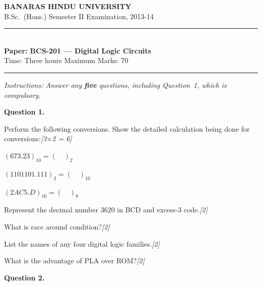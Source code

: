 \documentclass[11pt,a4paper]{article}
\newcommand{\pts}[1]{\hfill   \textit{[#1]}}
\begin{document}
\begin{center}
  {\large\bfseries BANARAS HINDU UNIVERSITY}\\[2pt]
  {\normalsize B.Sc.\ (Hons.) Semester II Examination, 2013-14}\\[6pt]
  \rule{0.8\linewidth}{0.5pt}\\[6pt]
  {\large\bfseries Paper: BCS-201 --- Digital Logic Circuits}\\[4pt]
  {\normalsize Time: Three hours \hfill Maximum Marks: 70}
\end{center}

\rule{\linewidth}{0.4pt}

\smallskip



\noindent   \textit{Instructions: Answer any   \textbf{five} questions, including Question~1, which is compulsory.}

\bigskip




\noindent   \textbf{Question 1.}

\begin{parts}
  \item Perform the following conversions. Show the detailed calculation being done for conversions:\pts{3$ \times$2 = 6}
  
\begin{parts}
    \item $(673.23)_{10} = (\quad)_2$
    \item $(1101101.111)_2 = (\quad)_{10}$
    \item $(2AC5.D)_{16} = (\quad)_8$
  \end{parts}
  \item Represent the decimal number $3620$ in BCD and excess-3 code.\pts{2}
  \item What is race around condition?\pts{2}
  \item List the names of any four digital logic families.\pts{2}
  \item What is the advantage of PLA over ROM?\pts{2}
\end{parts}

\bigskip




\noindent   \textbf{Question 2.}
\end{document}
